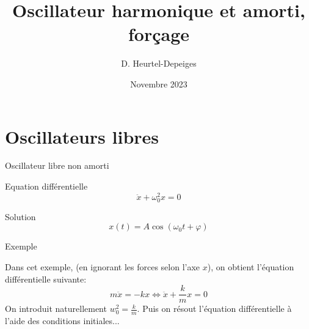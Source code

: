 \documentclass{beamer}
\begin{document}
    \author{D. Heurtel-Depeiges}
    \title{Oscillateur harmonique et amorti, forçage}
    \date{Novembre 2023}
    \begin{frame}
        \titlepage
    \end{frame}
    \section*{Oscillateurs libres}
    \begin{frame}{Oscillateur libre non amorti}
        \begin{block}{Equation différentielle}
            \begin{equation}
                \ddot{x} + \omega_0^2 x = 0
            \end{equation}
        \end{block}
        \begin{block}{Solution}
            \begin{equation}
                x(t) = A \cos(\omega_0 t + \varphi)
            \end{equation}
        \end{block}
        \begin{block}{Exemple}
            \begin{center}
        \end{center}
        Dans cet exemple, (en ignorant les forces selon l'axe $x$), on obtient l'équation différentielle suivante:
        \begin{equation}
            m \ddot{x} = -k x \iff \ddot{x} + \frac{k}{m} x = 0
        \end{equation}
        On introduit naturellement $w_0^2 = \frac{k}{m}$. Puis on résout l'équation différentielle à l'aide des conditions initiales...
        \end{block}
    \end{frame}
\end{document}
